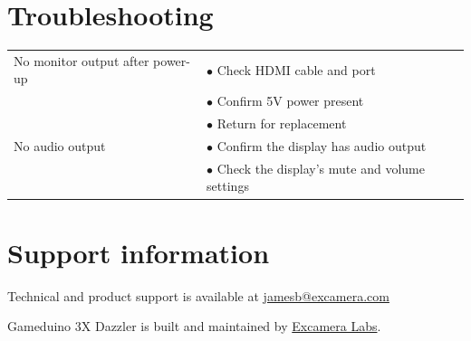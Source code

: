 \documentclass{article}
\newcommand{\device}{Gameduino 3X Dazzler}
\newcommand{\gap}{\vspace{10pt}}
\begin{document}
\newpage
\section{Troubleshooting}

\gap
\begin{tabular}{|l|l|}
\hline
No monitor output after power-up     & $\bullet$ Check HDMI cable and port \\
                                     & $\bullet$ Confirm 5V power present \\
                                     & $\bullet$ Return for replacement \\
\hline
No audio output                      & $\bullet$ Confirm the display has audio output \\
                                     & $\bullet$ Check the display's mute and volume settings \\
\hline
\end{tabular}
\gap

\section{Support information}

Technical and product support is available at
\href{mailto:jamesb@excamera.com}{jamesb@excamera.com}

\device{} is built and maintained by
\href{https://excamera.com}{Excamera Labs}.


\newpage
\raggedright
{}
\renewcommand{\indexname}{Index}
\printindex
\end{document}
